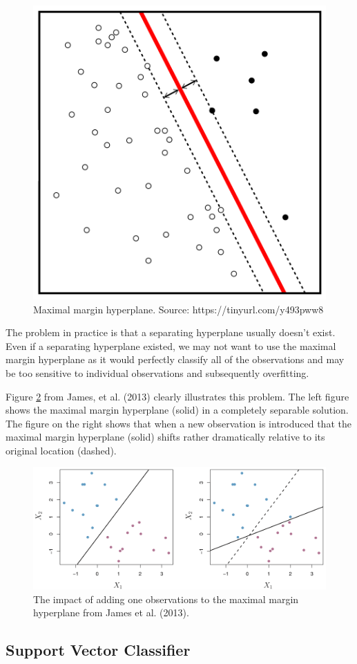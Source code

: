 \documentclass[]{book}
\begin{document}
\begin{figure}
\includegraphics[width=0.5\linewidth]{images/mmc} \caption{Maximal margin hyperplane. Source: https://tinyurl.com/y493pww8}\label{fig:mmc}
\end{figure}

The problem in practice is that a separating hyperplane usually doesn't exist. Even if a separating hyperplane existed, we may not want to use the maximal margin hyperplane as it would perfectly classify all of the observations and may be too sensitive to individual observations and subsequently overfitting.

Figure \ref{fig:fig95} from James, et al. (2013) clearly illustrates this problem. The left figure shows the maximal margin hyperplane (solid) in a completely separable solution. The figure on the right shows that when a new observation is introduced that the maximal margin hyperplane (solid) shifts rather dramatically relative to its original location (dashed).

\begin{figure}
\includegraphics[width=1\linewidth]{images/fig95} \caption{The impact of adding one observations to the maximal margin hyperplane from James et al. (2013).}\label{fig:fig95}
\end{figure}

\hypertarget{support-vector-classifier}{%
\subsection{Support Vector Classifier}\label{support-vector-classifier}}
\end{document}
